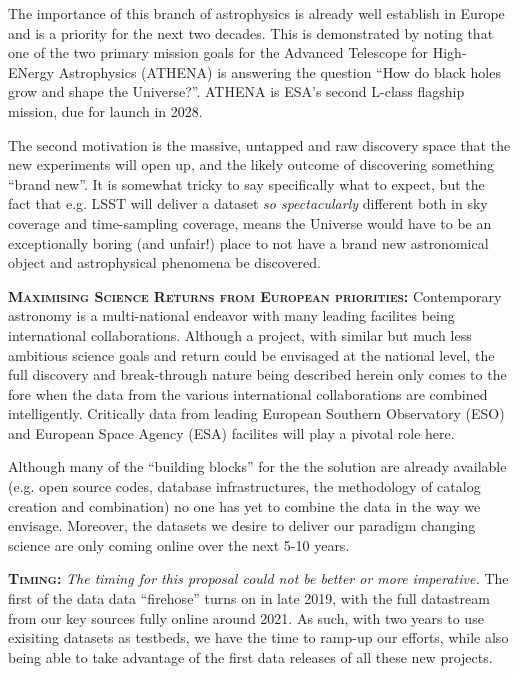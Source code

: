 \documentclass[oneside, a4paper, onecolumn, 11pt]{article}
\begin{document}
\smallskip
\smallskip
\noindent
The importance of this branch of astrophysics is already well
establish in Europe and is a priority for the next two decades. This
is demonstrated by noting that one of the two primary mission goals
for the Advanced Telescope for High-ENergy Astrophysics (ATHENA) is
answering the question ``How do black holes grow and shape the
Universe?''.  ATHENA is ESA's second L-class flagship mission, due for
launch in 2028.

\smallskip
\smallskip
\noindent
The second motivation is the massive, untapped and raw discovery space
that the new experiments will open up, and the likely outcome of
discovering something ``brand new''. It is somewhat tricky to say
specifically what to expect, but the fact that e.g. LSST will deliver
a dataset {\it so spectacularly} different both in sky coverage and
time-sampling coverage, means the Universe would have to be an
exceptionally boring (and unfair!) place to not have a brand new
astronomical object and astrophysical phenomena be discovered.

\smallskip
\smallskip
\noindent
\textbf{\textsc{\textcolor{Cerulean}{Maximising Science Returns from European priorities:}}}
Contemporary astronomy is a multi-national endeavor with many leading
facilites being international collaborations. Although a project, with
similar but much less ambitious science goals and return could be
envisaged at the national level, the full discovery and break-through
nature being described herein only comes to the fore when the data
from the various international collaborations are combined
intelligently.  Critically data from leading European Southern
Observatory (ESO) and European Space Agency (ESA) facilites will play
a pivotal role here.

\smallskip
\smallskip
\noindent
Although many of the ``building blocks'' for the the solution are
already available (e.g. open source codes, database infrastructures,
the methodology of catalog creation and combination) no one has yet to
combine the data in the way we envisage. Moreover, the datasets we
desire to deliver our paradigm changing science are only coming online
over the next 5-10 years.


\smallskip
\smallskip
\noindent
\textbf{\textsc{\textcolor{Cerulean}{Timing:}}}
{\it The timing for this proposal could not be better or more imperative.} 
The first of the data data ``firehose'' turns on in late 2019, with
the full datastream from our key sources fully online around 2021. 
As such, with two years to use exisiting datasets as testbeds, we 
have the time to ramp-up our efforts, while also being able to 
take advantage of the first data releases of all these new projects. 
\end{document}
